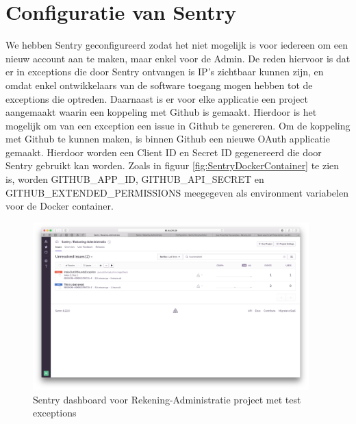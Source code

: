 \section{Configuratie van Sentry}
We hebben Sentry geconfigureerd zodat het niet mogelijk is voor iedereen om een nieuw account aan te maken, maar enkel voor de Admin. De reden hiervoor is dat er in exceptions die door Sentry ontvangen is IP's zichtbaar kunnen zijn, en omdat enkel ontwikkelaars van de software toegang mogen hebben tot de exceptions die optreden.
Daarnaast is er voor elke applicatie een project aangemaakt waarin een koppeling met Github is gemaakt. Hierdoor is het mogelijk om van een exception een issue in Github te genereren.
\newline
Om de koppeling met Github te kunnen maken, is binnen Github een nieuwe OAuth applicatie gemaakt. Hierdoor worden een Client ID en Secret ID gegenereerd die door Sentry gebruikt kan worden. Zoals in figuur \ref{fig:SentryDockerContainer} te zien is, worden GITHUB\_APP\_ID, GITHUB\_API\_SECRET en GITHUB\_EXTENDED\_PERMISSIONS meegegeven als environment variabelen voor de Docker container.

\begin{figure}[H]
	\centering
	\includegraphics[width=0.95\textwidth]{img/SentryDashboard.png}
	\caption{Sentry dashboard voor Rekening-Administratie project met test exceptions}
	\label{fig:SentryDashboard}
\end{figure}

\clearpage
